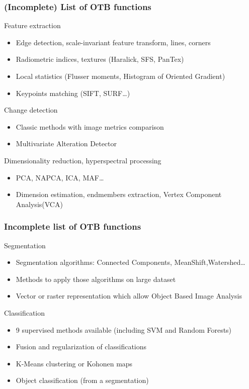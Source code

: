 \documentclass[8pt]{beamer}
\begin{document}
\begin{frame}
\frametitle{(Incomplete) List of OTB functions}

\begin{block}{Feature extraction}
\begin{itemize}
\item Edge detection, scale-invariant feature transform, lines, corners
\item Radiometric indices, textures (Haralick, SFS, PanTex)
\item Local statistics (Flusser moments, Histogram of Oriented Gradient)
\item Keypoints matching (SIFT, SURF\ldots)
\end{itemize}
\end{block}

\begin{block}{Change detection}
\begin{itemize}
\item Classic methods with image metrics comparison
\item Multivariate Alteration Detector
\end{itemize}
\end{block}

\begin{block}{Dimensionality reduction, hyperspectral processing}
\begin{itemize}
\item PCA, NAPCA, ICA, MAF\ldots
\item Dimension estimation, endmembers extraction, Vertex Component Analysis(VCA)
\end{itemize}
\end{block}

\end{frame}

\begin{frame}
\frametitle{Incomplete list of OTB functions}
\begin{block}{Segmentation}
\begin{itemize}
\item Segmentation algorithms: Connected Components, MeanShift,Watershed\ldots
\item Methods to apply those algorithms on large dataset
\item Vector or raster representation which allow Object Based Image Analysis
\end{itemize}
\end{block}

\begin{block}{Classification}
\begin{itemize}
\item 9 supervised methods available (including SVM and Random Forests)
\item Fusion and regularization of classifications
\item K-Means clustering or Kohonen maps
\item Object classification (from a segmentation)
\end{itemize}
\end{block}

\end{frame}
\end{document}
